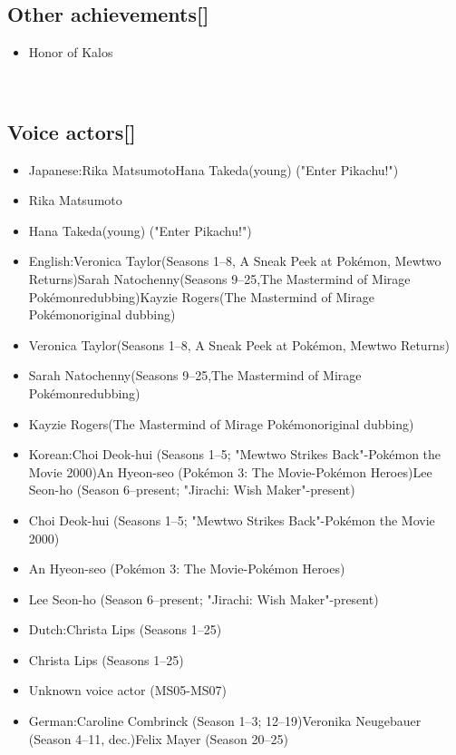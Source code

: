 \documentclass[a4paper,12pt]{article}
\begin{document}
\subsection*{Other achievements[]}\n\n\begin{itemize}
\item Honor of Kalos
\end{itemize}\\ \par \vspace{0.5cm}

\subsection*{Voice actors[]}\n\n\begin{itemize}
\item Japanese:Rika MatsumotoHana Takeda(young) ("Enter Pikachu!")
\item Rika Matsumoto
\item Hana Takeda(young) ("Enter Pikachu!")
\item English:Veronica Taylor(Seasons 1–8, A Sneak Peek at Pokémon, Mewtwo Returns)Sarah Natochenny(Seasons 9–25,The Mastermind of Mirage Pokémonredubbing)Kayzie Rogers(The Mastermind of Mirage Pokémonoriginal dubbing)
\item Veronica Taylor(Seasons 1–8, A Sneak Peek at Pokémon, Mewtwo Returns)
\item Sarah Natochenny(Seasons 9–25,The Mastermind of Mirage Pokémonredubbing)
\item Kayzie Rogers(The Mastermind of Mirage Pokémonoriginal dubbing)
\item Korean:Choi Deok-hui (Seasons 1–5; "Mewtwo Strikes Back"-Pokémon the Movie 2000)An Hyeon-seo (Pokémon 3: The Movie-Pokémon Heroes)Lee Seon-ho (Season 6–present; "Jirachi: Wish Maker"-present)
\item Choi Deok-hui (Seasons 1–5; "Mewtwo Strikes Back"-Pokémon the Movie 2000)
\item An Hyeon-seo (Pokémon 3: The Movie-Pokémon Heroes)
\item Lee Seon-ho (Season 6–present; "Jirachi: Wish Maker"-present)
\item Dutch:Christa Lips (Seasons 1–25)
\item Christa Lips (Seasons 1–25)
\item Unknown voice actor (MS05-MS07)
\item German:Caroline Combrinck (Season 1–3; 12–19)Veronika Neugebauer (Season 4–11, dec.)Felix Mayer (Season 20–25)

\end{itemize}
\end{document}
